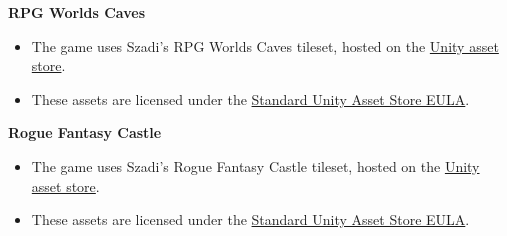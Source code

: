 \documentclass[10pt]{article}
\begin{document}
\textbf{RPG Worlds Caves}
\begin{itemize}
    \item The game uses Szadi's RPG Worlds Caves tileset, hosted on the \href{https://assetstore.unity.com/packages/2d/environments/rpg-worlds-caves-167274}{Unity asset store}.
    \item These assets are licensed under the \href{https://unity3d.com/legal/as_terms}{Standard Unity Asset Store EULA}.
\end{itemize}

\textbf{Rogue Fantasy Castle}
\begin{itemize}
    \item The game uses Szadi's Rogue Fantasy Castle tileset, hosted on the \href{https://assetstore.unity.com/packages/2d/environments/rogue-fantasy-castle-164725}{Unity asset store}.
    \item These assets are licensed under the \href{https://unity3d.com/legal/as_terms}{Standard Unity Asset Store EULA}.
\end{itemize}









\end{document}
